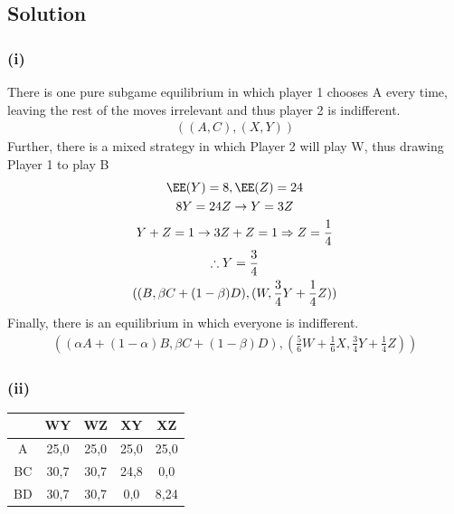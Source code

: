 \documentclass[10pt, a4paper]{article}
\begin{document}
  \subsection*{Solution}
    \subsubsection*{(i)}
      There is one pure subgame equilibrium in which player 1 chooses A every time, leaving the rest of the moves irrelevant and thus player 2 is indifferent.
      \begin{gather*}
        ((A,C),(X,Y))
      \end{gather*}
      Further, there is a mixed strategy in which Player 2 will play W, thus drawing Player 1 to play B
      \begin{gather*}
        \EE(Y) = 8, \EE(Z) = 24 \\
        8Y = 24Z \rightarrow Y = 3Z \\
        Y + Z = 1 \rightarrow 3Z + Z = 1 \Rightarrow Z = \frac{1}{4} \\ 
        \therefore Y = \frac{3}{4} \\
        ((B, \beta C + (1-\beta)D), (W, \frac{3}{4}Y + \frac{1}{4}Z))
      \end{gather*}
      Finally, there is an equilibrium in which everyone is indifferent.
      \begin{gather*}
        ((\alpha A + (1-\alpha)B, \beta C + (1-\beta)D),(\frac{5}{6}W + \frac{1}{6}X,\frac{3}{4}Y+\frac{1}{4}Z))
      \end{gather*}
    \subsubsection*{(ii)}
      \begin{center}
        \begin{tabular}{|c|c|c|c|c|}
            \hline
          & WY & WZ & XY & XZ \\
          \hline
          A & 25,0 & 25,0 & 25,0 & 25,0 \\
          \hline
          BC & 30,7 & 30,7 & 24,8 & 0,0 \\
          \hline
          BD & 30,7 & 30,7 & 0,0 & 8,24 \\
          \hline
        \end{tabular}
      \end{center}
\end{document}
